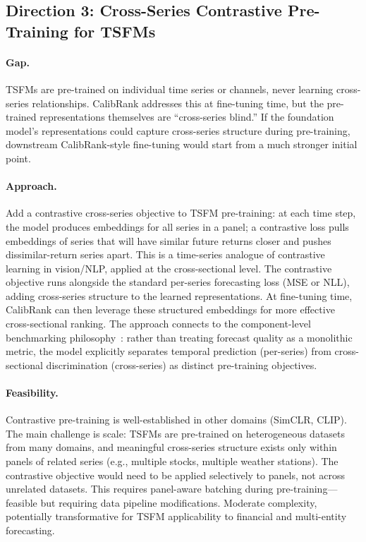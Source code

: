 \documentclass[11pt,a4paper]{article}
\begin{document}
\subsection{Direction 3: Cross-Series Contrastive Pre-Training for TSFMs}

\paragraph{Gap.} TSFMs are pre-trained on individual time series or channels, never learning cross-series relationships. CalibRank addresses this at fine-tuning time, but the pre-trained representations themselves are ``cross-series blind.'' If the foundation model's representations could capture cross-series structure during pre-training, downstream CalibRank-style fine-tuning would start from a much stronger initial point.

\paragraph{Approach.} Add a contrastive cross-series objective to TSFM pre-training: at each time step, the model produces embeddings for all series in a panel; a contrastive loss pulls embeddings of series that will have similar future returns closer and pushes dissimilar-return series apart. This is a time-series analogue of contrastive learning in vision/NLP, applied at the cross-sectional level. The contrastive objective runs alongside the standard per-series forecasting loss (MSE or NLL), adding cross-series structure to the learned representations. At fine-tuning time, CalibRank can then leverage these structured embeddings for more effective cross-sectional ranking. The approach connects to the component-level benchmarking philosophy~\cite{compbench2026}: rather than treating forecast quality as a monolithic metric, the model explicitly separates temporal prediction (per-series) from cross-sectional discrimination (cross-series) as distinct pre-training objectives.

\paragraph{Feasibility.} Contrastive pre-training is well-established in other domains (SimCLR, CLIP). The main challenge is scale: TSFMs are pre-trained on heterogeneous datasets from many domains, and meaningful cross-series structure exists only within panels of related series (e.g., multiple stocks, multiple weather stations). The contrastive objective would need to be applied selectively to panels, not across unrelated datasets. This requires panel-aware batching during pre-training---feasible but requiring data pipeline modifications. Moderate complexity, potentially transformative for TSFM applicability to financial and multi-entity forecasting.
\end{document}
